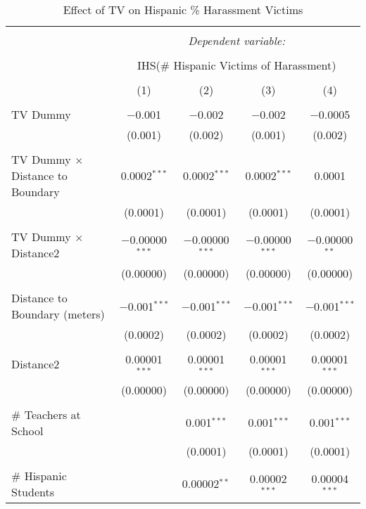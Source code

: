 
\begin{table}[!htbp] \centering 
  \caption{Effect of TV on Hispanic \% Harassment Victims} 
  \label{} 
\begin{tabular}{@{\extracolsep{-2pt}}lcccc} 
\\[-1.8ex]\hline 
\hline \\[-1.8ex] 
 & \multicolumn{4}{c}{\textit{Dependent variable:}} \\ 
\cline{2-5} 
\\[-1.8ex] & \multicolumn{4}{c}{IHS(\# Hispanic Victims of Harassment)} \\ 
\\[-1.8ex] & (1) & (2) & (3) & (4)\\ 
\hline \\[-1.8ex] 
 TV Dummy & $-$0.001 & $-$0.002 & $-$0.002 & $-$0.0005 \\ 
  & (0.001) & (0.002) & (0.001) & (0.002) \\ 
  & & & & \\ 
 TV Dummy $\times$ Distance to Boundary & 0.0002$^{***}$ & 0.0002$^{***}$ & 0.0002$^{***}$ & 0.0001 \\ 
  & (0.0001) & (0.0001) & (0.0001) & (0.0001) \\ 
  & & & & \\ 
 TV Dummy $\times$ Distance2 & $-$0.00000$^{***}$ & $-$0.00000$^{***}$ & $-$0.00000$^{***}$ & $-$0.00000$^{**}$ \\ 
  & (0.00000) & (0.00000) & (0.00000) & (0.00000) \\ 
  & & & & \\ 
 Distance to Boundary (meters) & $-$0.001$^{***}$ & $-$0.001$^{***}$ & $-$0.001$^{***}$ & $-$0.001$^{***}$ \\ 
  & (0.0002) & (0.0002) & (0.0002) & (0.0002) \\ 
  & & & & \\ 
 Distance2 & 0.00001$^{***}$ & 0.00001$^{***}$ & 0.00001$^{***}$ & 0.00001$^{***}$ \\ 
  & (0.00000) & (0.00000) & (0.00000) & (0.00000) \\ 
  & & & & \\ 
 \# Teachers at School &  & 0.001$^{***}$ & 0.001$^{***}$ & 0.001$^{***}$ \\ 
  &  & (0.0001) & (0.0001) & (0.0001) \\ 
  & & & & \\ 
 \# Hispanic Students &  & 0.00002$^{**}$ & 0.00002$^{***}$ & 0.00004$^{***}$ \\ 

\end{tabular}
\end{table}
